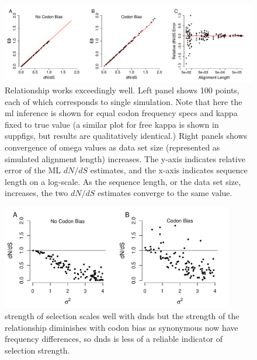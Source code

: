 \documentclass[11pt]{article}
\begin{document}
\clearpage
\newpage	

\begin{figure}[H]
\centerline{\includegraphics[width=6in]{figures/MainText/regression_convergence.pdf}}
\caption{\label{reg_conv} Relationship works exceedingly well. Left panel shows 100 points, each of which corresponds to single simulation. Note that here the ml inference is shown for equal codon frequency specs and kappa fixed to true value (a similar plot for free kappa is shown in suppfigs, but results are qualitatively identical.) Right panels shows convergence of omega values as data set size (represented as simulated alignment length) increases. The y-axis indicates relative error of the ML $dN/dS$ estimates, and the x-axis indicates sequence length on a log-scale. As the sequence length, or the data set size, increases, the two $dN/dS$ estimates converge to the same value. }
\end{figure}


\bigskip
\begin{figure}[H]
\centerline{\includegraphics[width=4in]{figures/MainText/sd_vs_dnds.pdf}}
\caption{\label{stddev_dnds} strength of selection scales well with dnds but the strength of the relationship diminishes with codon bias as synonymous now have frequency differences, so dnds is less of a reliable indicator of selection strength.}
\end{figure}
\end{document}
